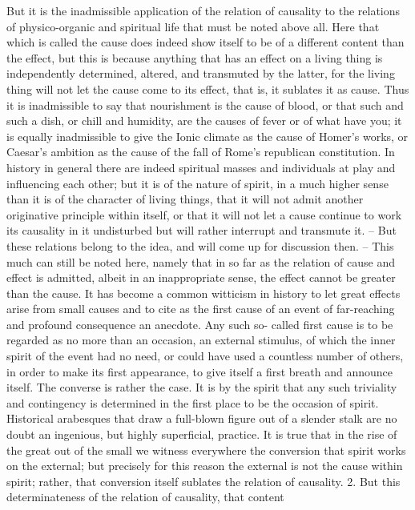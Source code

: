 But it is the inadmissible application of the relation of causality to the
relations of physico-organic and spiritual life that must be noted above all.
Here that which is called the cause does indeed show itself to be of a different
content than the effect, but this is because anything that has an effect on a
living thing is independently determined, altered, and transmuted by the
latter, for the living thing will not let the cause come to its effect, that is, it
sublates it as cause. Thus it is inadmissible to say that nourishment is the
cause of blood, or that such and such a dish, or chill and humidity, are the
causes of fever or of what have you; it is equally inadmissible to give the Ionic
climate as the cause of Homer’s works, or Caesar’s ambition as the cause of
the fall of Rome’s republican constitution. In history in general there are
indeed spiritual masses and individuals at play and influencing each other;
but it is of the nature of spirit, in a much higher sense than it is of the
character of living things, that it will not admit another originative principle
within itself, or that it will not let a cause continue to work its causality
in it undisturbed but will rather interrupt and transmute it. – But these
relations belong to the idea, and will come up for discussion then. – This
much can still be noted here, namely that in so far as the relation of cause
and effect is admitted, albeit in an inappropriate sense, the effect cannot
be greater than the cause. It has become a common witticism in history
to let great effects arise from small causes and to cite as the first cause of an
event of far-reaching and profound consequence an anecdote. Any such so-
called first cause is to be regarded as no more than an occasion, an external
stimulus, of which the inner spirit of the event had no need, or could have
used a countless number of others, in order to make its first appearance,
to give itself a first breath and announce itself. The converse is rather the
case. It is by the spirit that any such triviality and contingency is determined
in the first place to be the occasion of spirit. Historical arabesques that draw
a full-blown figure out of a slender stalk are no doubt an ingenious, but
highly superficial, practice. It is true that in the rise of the great out of
the small we witness everywhere the conversion that spirit works on the
external; but precisely for this reason the external is not the cause within
spirit; rather, that conversion itself sublates the relation of causality.
2. But this determinateness of the relation of causality, that content
